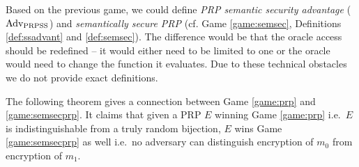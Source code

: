 \begin{note}
\label{note:semsecprp}
	Based on the previous game, we could define {\em PRP semantic security advantage} ($\operatorname*{Adv_{PRPSS}}$) and {\em semantically secure PRP} (cf. Game \ref{game:semsec}, Definitions \ref{def:ssadvant} and \ref{def:semsec}). The difference would be that the oracle access should be redefined -- it would either need to be limited to one or the oracle would need to change the function it evaluates. Due to these technical obstacles we do not provide exact definitions.
\end{note}

The following theorem gives a connection between Game \ref{game:prp} and \ref{game:semsecprp}. It claims that given a PRP $E$ winning Game \ref{game:prp} i.e.\ $E$ is indistinguishable from a truly random bijection, $E$ wins Game \ref{game:semsecprp} as well i.e.\ no adversary can distinguish encryption of $m_0$ from encryption of $m_1$.


